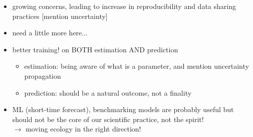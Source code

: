 \documentclass[11pt]{article}
\begin{document}
\begin{enumerate}
\begin{itemize}
\item growing concerns, leading to increase in reproducibility and data sharing practices [mention uncertainty]
\item need a little more here...
\item better training! on BOTH estimation AND prediction
\begin{itemize}
\item estimation: being aware of what is a parameter, and mention uncertainty propagation
\item prediction: should be a natural outcome, not a finality
\end{itemize}
\item ML (short-time forecast), benchmarking models are probably useful but should not be the core of our scientific practice, not the spirit!\\
$\rightarrow$ moving ecology in the right direction!
\end{itemize}
\end{enumerate}
\end{document}
